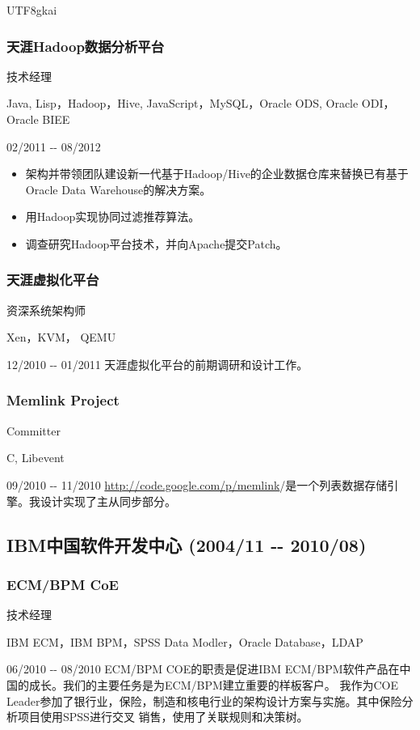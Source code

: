 \documentclass[a4paper]{article}
\newenvironment{DUlineblock}[1]{%
    \list{}{\setlength{\partopsep}{\parskip}
            \addtolength{\partopsep}{\baselineskip}
            \setlength{\topsep}{0pt}
            \setlength{\itemsep}{0.15\baselineskip}
            \setlength{\parsep}{0pt}
            \setlength{\leftmargin}{#1}}
    \raggedright
  }
  {\endlist}
\begin{document}
\begin{CJK}{UTF8}{gkai}
\subsubsection*{天涯Hadoop数据分析平台}
\begin{DUlineblock}{0em}
\item[] 技术经理
\item[] Java, Lisp，Hadoop，Hive, JavaScript，MySQL，Oracle ODS, Oracle ODI，Oracle BIEE
\item[] 02/2011 -{}- 08/2012
\end{DUlineblock}
%
\begin{itemize}
\item 架构并带领团队建设新一代基于Hadoop/Hive的企业数据仓库来替换已有基于Oracle Data Warehouse的解决方案。
\item 用Hadoop实现协同过滤推荐算法。
\item 调查研究Hadoop平台技术，并向Apache提交Patch。
\end{itemize}

\subsubsection*{天涯虚拟化平台}
\begin{DUlineblock}{0em}
\item[] 资深系统架构师
\item[] Xen，KVM， QEMU
\item[] 12/2010 -{}- 01/2011
\end{DUlineblock}
天涯虚拟化平台的前期调研和设计工作。

\subsubsection*{Memlink Project}
\begin{DUlineblock}{0em}
\item[] Committer
\item[] C, Libevent
\item[] 09/2010 -{}- 11/2010
\end{DUlineblock}
\url{http://code.google.com/p/memlink}/是一个列表数据存储引擎。我设计实现了主从同步部分。


\subsection*{IBM中国软件开发中心 (2004/11 -{}- 2010/08)}

\subsubsection*{ECM/BPM CoE}
\begin{DUlineblock}{0em}
\item[] 技术经理
\item[] IBM ECM，IBM BPM，SPSS Data Modler，Oracle Database，LDAP
\item[] 06/2010 -{}- 08/2010
\end{DUlineblock}
ECM/BPM COE的职责是促进IBM ECM/BPM软件产品在中国的成长。我们的主要任务是为ECM/BPM建立重要的样板客户。
我作为COE Leader参加了银行业，保险，制造和核电行业的架构设计方案与实施。其中保险分析项目使用SPSS进行交叉
销售，使用了关联规则和决策树。


\end{CJK}
\end{document}
